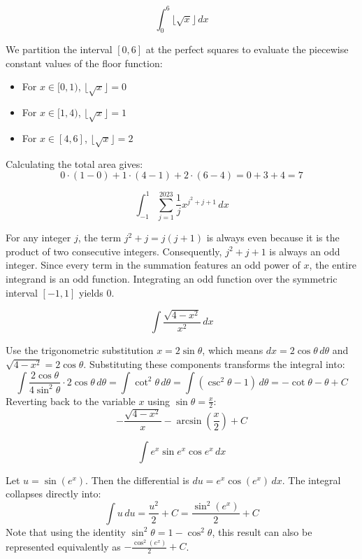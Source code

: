 \begin{questions}
    \question \[ \int_{0}^{6} \lfloor \sqrt{x} \rfloor \,dx \]
    \begin{solution}
        We partition the interval $[0,6]$ at the perfect squares to evaluate the piecewise constant values of the floor function:
        \begin{itemize}
            \item For $x \in [0, 1)$, $\lfloor \sqrt{x} \rfloor = 0$
            \item For $x \in [1, 4)$, $\lfloor \sqrt{x} \rfloor = 1$
            \item For $x \in [4, 6]$, $\lfloor \sqrt{x} \rfloor = 2$
        \end{itemize}
        Calculating the total area gives:
        \[ 0 \cdot (1 - 0) + 1 \cdot (4 - 1) + 2 \cdot (6 - 4) = 0 + 3 + 4 = 7 \]
    \end{solution}

    \question \[ \int_{-1}^{1} \sum_{j=1}^{2023} \frac{1}{j} x^{j^2+j+1} \,dx \]
    \begin{solution}
        For any integer $j$, the term $j^2+j = j(j+1)$ is always even because it is the product of two consecutive integers. Consequently, $j^2+j+1$ is always an odd integer.
        Since every term in the summation features an odd power of $x$, the entire integrand is an odd function. Integrating an odd function over the symmetric interval $[-1, 1]$ yields $0$.
    \end{solution}

    \question \[ \int \frac{\sqrt{4-x^2}}{x^2} \,dx \]
    \begin{solution}
        Use the trigonometric substitution $x = 2\sin\theta$, which means $dx = 2\cos\theta \,d\theta$ and $\sqrt{4-x^2} = 2\cos\theta$. Substituting these components transforms the integral into:
        \[ \int \frac{2\cos\theta}{4\sin^2\theta} \cdot 2\cos\theta \,d\theta = \int \cot^2\theta \,d\theta = \int (\csc^2\theta - 1) \,d\theta = -\cot\theta - \theta + C \]
        Reverting back to the variable $x$ using $\sin\theta = \frac{x}{2}$:
        \[ -\frac{\sqrt{4-x^2}}{x} - \arcsin\left(\frac{x}{2}\right) + C \]
    \end{solution}

    \question \[ \int e^x \sin e^x \cos e^x \,dx \]
    \begin{solution}
        Let $u = \sin(e^x)$. Then the differential is $du = e^x \cos(e^x) \,dx$. The integral collapses directly into:
        \[ \int u \,du = \frac{u^2}{2} + C = \frac{\sin^2(e^x)}{2} + C \]
        Note that using the identity $\sin^2\theta = 1 - \cos^2\theta$, this result can also be represented equivalently as $-\frac{\cos^2(e^x)}{2} + C$.
    \end{solution}


\end{questions}
